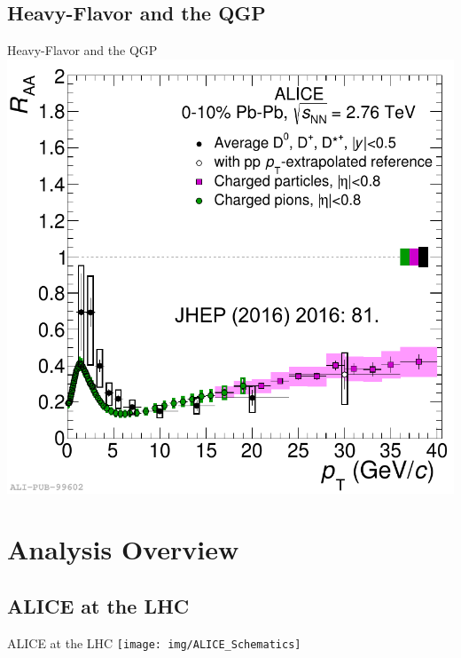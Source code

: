 \documentclass{beamer}
\begin{document}
\subsection{Heavy-Flavor and the QGP}
\begin{frame}{Heavy-Flavor and the QGP}
\centering
\includegraphics[width=.4\paperwidth]{img/ALICE_DMesonRAA}
\end{frame}

\section{Analysis Overview}

\subsection{ALICE at the LHC}
\begin{frame}{ALICE at the LHC}
\centering
\texttt{[image: img/ALICE\_Schematics]}
\end{frame}
\end{document}
